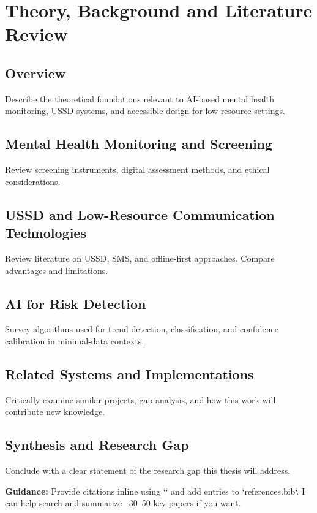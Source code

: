 \chapter{Theory, Background and Literature Review}
\label{ch:lit}

\section{Overview}
\noindent Describe the theoretical foundations relevant to AI-based mental health monitoring, USSD systems, and accessible design for low-resource settings.

\section{Mental Health Monitoring and Screening}
\noindent Review screening instruments, digital assessment methods, and ethical considerations.

\section{USSD and Low-Resource Communication Technologies}
\noindent Review literature on USSD, SMS, and offline-first approaches. Compare advantages and limitations.

\section{AI for Risk Detection}
\noindent Survey algorithms used for trend detection, classification, and confidence calibration in minimal-data contexts.

\section{Related Systems and Implementations}
\noindent Critically examine similar projects, gap analysis, and how this work will contribute new knowledge.

\section{Synthesis and Research Gap}
\noindent Conclude with a clear statement of the research gap this thesis will address.

\textbf{Guidance:} Provide citations inline using `\cite{}` and add entries to `references.bib`. I can help search and summarize ~30–50 key papers if you want.
